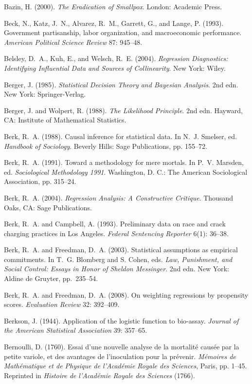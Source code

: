 \smallskip\noindent
Bazin, H. (2000).
{\it The Eradication of Smallpox\/}.
London: Academic Press.

\smallskip\noindent
Beck, N., Katz,  J.~N., Alvarez, R.~M., Garrett, G., and Lange, P. (1993).
Government partisanship, labor organization, and macroeconomic performance.
{\it American Political Science Review\/} 87: 945--48.

\smallskip \noindent
Belsley, D.~A., Kuh, E., and Welsch, R.~E. (2004).
{\it Regression Diagnostics: Identifying Influential Data and Sources of Collinearity\/}.
New York: Wiley.

\smallskip\noindent
Berger, J. (1985).
{\it Statistical Decision Theory and Bayesian Analysis\/}. 2nd edn.
New York: Springer-Verlag.

\smallskip\noindent
Berger, J. and Wolpert, R. (1988).
{\it The Likelihood Principle\/}. 2nd edn.
Hayward, CA: Institute of Mathematical Statistics.

\smallskip\noindent
Berk, R.~A. (1988).
Causal inference for statistical data.
In N.~J. Smelser, ed. {\it Handbook of Sociology}.
Beverly Hills: Sage Publications, pp. 155--72.

\smallskip\noindent
Berk, R.~A. (1991).
Toward a methodology for mere mortals.
In P.~V. Marsden, ed. {\it Sociological Methodology 1991\/}.
Washington, D. C.: The American Sociological Association, pp. 315--24.

\smallskip\noindent
Berk, R.~A. (2004).
{\it Regression Analysis: A Constructive Critique\/}.
Thousand Oaks, CA: Sage Publications.

\smallskip\noindent
Berk, R.~A. and Campbell, A. (1993).
Preliminary data on race and crack charging practices in Los Angeles.
{\it Federal Sentencing Reporter\/} 6(1): 36--38.

\smallskip\noindent
Berk, R.~A. and Freedman, D.~A. (2003).
Statistical assumptions as empirical commitments.
In T.~G. Blomberg and S. Cohen, eds.
{\it Law, Punishment, and Social Control: Essays in Honor of Sheldon Messinger\/}. 2nd edn.
New York: Aldine de Gruyter, pp.~235--54.

\smallskip\noindent
Berk, R.~A. and Freedman, D.~A. (2008).
On weighting regressions by propensity scores.
{\it Evaluation Review\/} 32: 392--409.

\smallskip\noindent
Berkson, J. (1944).
Application of the logistic function to bio-assay.
{\it Journal of the American Statistical Association\/} {39}: 357--65.

\smallskip\noindent
Bernoulli, D. (1760).
Essai d'une nouvelle analyse de la mortalit\'e caus\'ee par la petite variole, et des
avantages de l'inoculation pour la pr\'evenir.
{\it M\'emoires de Math\'ematique et de Physique de l'Acad\'emie
Royale des Sciences\/}, Paris, pp. 1--45.
Reprinted in {\it Histoire de l'Acad\'emie Royale des Sciences\/} (1766).

